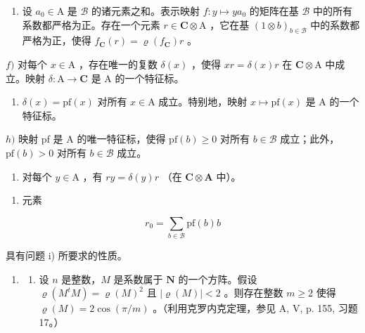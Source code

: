 \begin{enumerate}
\def\labelenumi{\alph{enumi})}
\setcounter{enumi}{4}
\tightlist
\item
  设 \(a_0 \in \mathrm{A}\) 是 \(\mathcal{B}\) 的诸元素之和。表示映射 \(f: y \mapsto ya_0\) 的矩阵在基 \(\mathcal{B}\) 中的所有系数都严格为正。存在一个元素 \(r \in \mathbf{C} \otimes \mathrm{A}\) ，它在基 \((1 \otimes b)_{b \in \mathcal{B}}\) 中的系数都严格为正，使得 \(f_{\mathbf{C}}(r) = \varrho(f_{\mathbf{C}})r\) 。
\end{enumerate}

\(f)\) 对每个 \(x \in \mathrm{A}\) ，存在唯一的复数 \(\delta(x)\) ，使得 \(xr = \delta(x)r\) 在 \(\mathbf{C} \otimes \mathrm{A}\) 中成立。映射 \(\delta: \mathrm{A} \to \mathbf{C}\) 是 \(\mathrm{A}\) 的一个特征标。

\begin{enumerate}
\def\labelenumi{\alph{enumi})}
\setcounter{enumi}{6}
\tightlist
\item
  \(\delta(x) = \mathrm{pf}(x)\) 对所有 \(x \in \mathrm{A}\) 成立。特别地，映射 \(x \mapsto \mathrm{pf}(x)\) 是 A 的一个特征标。
\end{enumerate}

\(h)\) 映射 pf 是 A 的唯一特征标，使得 \(\mathrm{pf}(b) \geqslant 0\) 对所有 \(b \in \mathcal{B}\) 成立；此外，\(\mathrm{pf}(b) > 0\) 对所有 \(b \in \mathcal{B}\) 成立。

\begin{enumerate}
\def\labelenumi{\roman{enumi})}
\tightlist
\item
  对每个 \(y \in \mathrm{A}\) ，有 \(ry = \delta(y)r\) （在 \(\mathbf{C} \otimes \mathbf{A}\) 中）。
\end{enumerate}

\begin{enumerate}
\def\labelenumi{\alph{enumi})}
\setcounter{enumi}{9}
\tightlist
\item
  元素
\end{enumerate}

\[
r _ {0} = \sum_ {b \in \mathcal {B}} \mathrm{pf} (b) b
\]

具有问题 i) 所要求的性质。

\begin{enumerate}
\def\labelenumi{\arabic{enumi})}
\setcounter{enumi}{8}
\tightlist
\item
  \begin{enumerate}
  \def\labelenumii{\alph{enumii})}
  \tightlist
  \item
    设 \(n\) 是整数，\(M\) 是系数属于 \(\mathbf{N}\) 的一个方阵。假设 \(\varrho(M^t M) = \varrho(M)^2\) 且 \(|\varrho(M)| < 2\) 。则存在整数 \(m \geqslant 2\) 使得 \(\varrho(M) = 2\cos(\pi/m)\) 。（利用克罗内克定理，参见 A, V, p. 155, 习题 17。）
  \end{enumerate}
\end{enumerate}

